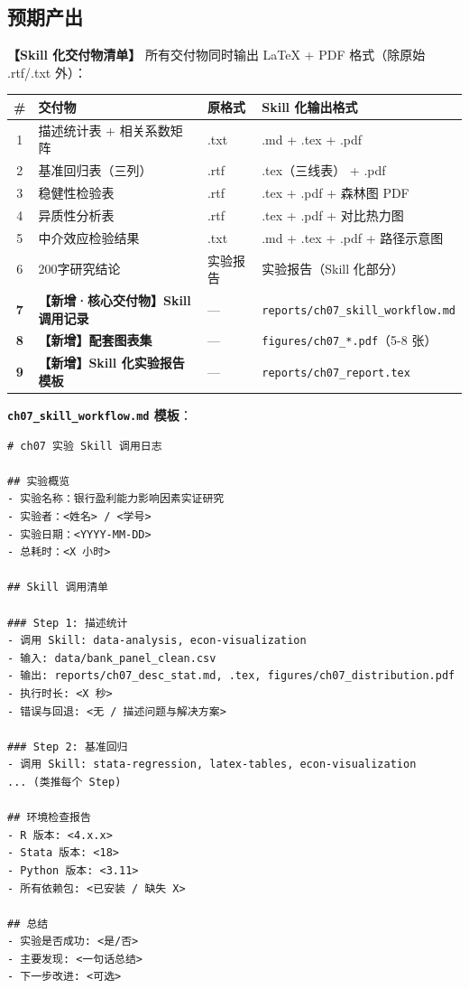 \subsection{预期产出}

\textbf{【Skill 化交付物清单】} 所有交付物同时输出 LaTeX + PDF 格式（除原始 .rtf/.txt 外）：

\begin{table}[H]
\centering
\begin{tabular}{clll}
\toprule
\textbf{\#} & \textbf{交付物} & \textbf{原格式} & \textbf{Skill 化输出格式} \\
\midrule
1 & 描述统计表 + 相关系数矩阵 & .txt & .md + .tex + .pdf \\
2 & 基准回归表（三列） & .rtf & .tex（三线表） + .pdf \\
3 & 稳健性检验表 & .rtf & .tex + .pdf + 森林图 PDF \\
4 & 异质性分析表 & .rtf & .tex + .pdf + 对比热力图 \\
5 & 中介效应检验结果 & .txt & .md + .tex + .pdf + 路径示意图 \\
6 & 200字研究结论 & 实验报告 & 实验报告（Skill 化部分） \\
\textbf{7} & \textbf{【新增·核心交付物】Skill 调用记录} & --- & \texttt{reports/ch07\_skill\_workflow.md} \\
\textbf{8} & \textbf{【新增】配套图表集} & --- & \texttt{figures/ch07\_*.pdf}（5-8 张） \\
\textbf{9} & \textbf{【新增】Skill 化实验报告模板} & --- & \texttt{reports/ch07\_report.tex} \\
\bottomrule
\end{tabular}
\end{table}

\textbf{\texttt{ch07\_skill\_workflow.md} 模板}：

\begin{lstlisting}[style=markdown]
# ch07 实验 Skill 调用日志

## 实验概览
- 实验名称：银行盈利能力影响因素实证研究
- 实验者：<姓名> / <学号>
- 实验日期：<YYYY-MM-DD>
- 总耗时：<X 小时>

## Skill 调用清单

### Step 1: 描述统计
- 调用 Skill: data-analysis, econ-visualization
- 输入: data/bank_panel_clean.csv
- 输出: reports/ch07_desc_stat.md, .tex, figures/ch07_distribution.pdf
- 执行时长: <X 秒>
- 错误与回退: <无 / 描述问题与解决方案>

### Step 2: 基准回归
- 调用 Skill: stata-regression, latex-tables, econ-visualization
... (类推每个 Step)

## 环境检查报告
- R 版本: <4.x.x>
- Stata 版本: <18>
- Python 版本: <3.11>
- 所有依赖包: <已安装 / 缺失 X>

## 总结
- 实验是否成功: <是/否>
- 主要发现: <一句话总结>
- 下一步改进: <可选>
\end{lstlisting}


